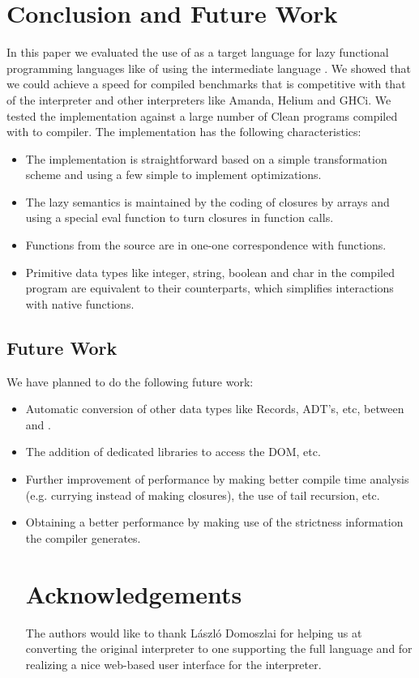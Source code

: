 \section{Conclusion and Future Work}\label{sapljs:sec:conclusions}
In this paper we evaluated the use of \JS as a target language for lazy functional programming languages like \Haskell of \Clean using the intermediate language \Sapl.
We showed that we could achieve a speed for compiled benchmarks 
that is competitive with that of the  \Sapl interpreter and other interpreters like Amanda, Helium and GHCi.
We tested the implementation against a large number of Clean programs compiled with \Clean to \Sapl compiler. 
The implementation has the following characteristics:
\begin{itemize}
\item The implementation is straightforward based on a simple transformation scheme and using a few simple to implement optimizations.
\item The lazy semantics is maintained by the coding of closures by \JS arrays and using a special \textsf{eval} function to turn closures in function calls.
\item Functions from the source are in one-one correspondence with \JS functions.
\item Primitive data types like integer, string, boolean and char in the compiled program are equivalent to their \JS counterparts, which simplifies interactions with native \JS functions.
\end{itemize}

\subsection{Future Work}
We have planned to do the following future work:
\begin{itemize}
\item Automatic conversion of other data types like Records, ADT's, etc, between \Sapl and \JS.
\item The addition of dedicated libraries to access the DOM, etc.
\item Further improvement of performance by making better compile time analysis (e.g. \JS currying instead of making closures),
the use of tail recursion, etc.
\item Obtaining a better performance by making use of the strictness information the \Clean compiler generates.

\section*{Acknowledgements}
The authors would like to thank L\'aszl\'o Domoszlai for helping us at converting the original interpreter to one supporting the full \Sapl language and
for realizing a nice web-based user interface for the interpreter.
\end{itemize}